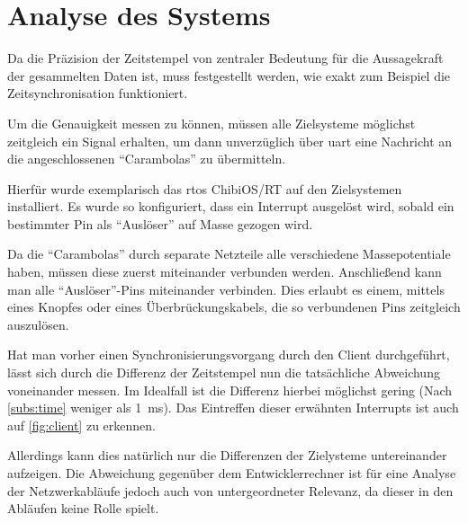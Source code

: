 \section{Analyse des Systems}\label{sect:analyse}
Da die Präzision der Zeitstempel von zentraler Bedeutung für die
Aussagekraft der gesammelten Daten ist, muss festgestellt werden, wie exakt zum Beispiel die
Zeitsynchronisation funktioniert.

Um die Genauigkeit messen zu können, müssen alle Zielsysteme möglichst
zeitgleich ein Signal erhalten, um dann unverzüglich über \gls{uart} eine
Nachricht an die angeschlossenen "`Carambolas"' zu übermitteln.

Hierfür wurde exemplarisch das \gls{rtos} ChibiOS/RT\cite{CHIB} auf den
Zielsystemen installiert. Es wurde so konfiguriert, dass ein Interrupt ausgelöst
wird, sobald ein bestimmter Pin als "`Auslöser"' auf Masse gezogen wird.

Da die "`Carambolas"' durch separate Netzteile alle verschiedene Massepotentiale
haben, müssen diese zuerst miteinander verbunden werden. Anschließend kann man
alle "`Auslöser"'-Pins miteinander verbinden. Dies erlaubt es einem, mittels
eines Knopfes oder eines Überbrückungskabels, die so verbundenen Pins zeitgleich
auszulösen.

Hat man vorher einen Synchronisierungsvorgang durch den Client durchgeführt,
lässt sich durch die Differenz der Zeitstempel nun die tatsächliche Abweichung
voneinander messen. Im Idealfall ist die Differenz hierbei möglichst gering
(Nach \autoref{subs:time} weniger als \SI{1}{\milli\second}). Das Eintreffen
dieser erwähnten Interrupts ist auch auf \autoref{fig:client} zu erkennen.

Allerdings kann dies natürlich nur die Differenzen der Zielysteme untereinander
aufzeigen. Die Abweichung gegenüber dem Entwicklerrechner ist für eine Analyse
der Netzwerkabläufe jedoch auch von untergeordneter Relevanz, da dieser in den
Abläufen keine Rolle spielt.


